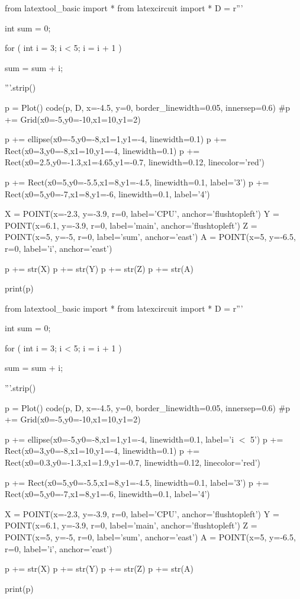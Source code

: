 \begin{python}
from latextool_basic import *
from latexcircuit import *
D = r'''



int sum = 0;

    for ( int i = 3;     i < 5;     i = i + 1 )


        sum = sum + i;



'''.strip()

p = Plot()
code(p, D, x=-4.5, y=0, border_linewidth=0.05, innersep=0.6)
#p += Grid(x0=-5,y0=-10,x1=10,y1=2)

p += ellipse(x0=-5,y0=-8,x1=1,y1=-4, linewidth=0.1)
p += Rect(x0=3,y0=-8,x1=10,y1=-4, linewidth=0.1)
p += Rect(x0=2.5,y0=-1.3,x1=4.65,y1=-0.7, linewidth=0.12, linecolor='red')

p += Rect(x0=5,y0=-5.5,x1=8,y1=-4.5, linewidth=0.1, label='3')
p += Rect(x0=5,y0=-7,x1=8,y1=-6, linewidth=0.1, label='4')

X = POINT(x=-2.3, y=-3.9, r=0, label='CPU', anchor='flushtopleft')
Y = POINT(x=6.1, y=-3.9, r=0, label='main', anchor='flushtopleft')
Z = POINT(x=5, y=-5, r=0, label='sum', anchor='east')
A = POINT(x=5, y=-6.5, r=0, label='i', anchor='east')

p += str(X)
p += str(Y)
p += str(Z)
p += str(A)

print(p)
\end{python}

\begin{python}
from latextool_basic import *
from latexcircuit import *
D = r'''



int sum = 0;

    for ( int i = 3;     i < 5;     i = i + 1 )


        sum = sum + i;



'''.strip()

p = Plot()
code(p, D, x=-4.5, y=0, border_linewidth=0.05, innersep=0.6)
#p += Grid(x0=-5,y0=-10,x1=10,y1=2)

p += ellipse(x0=-5,y0=-8,x1=1,y1=-4, linewidth=0.1, label='i $<$ 5')
p += Rect(x0=3,y0=-8,x1=10,y1=-4, linewidth=0.1)
p += Rect(x0=0.3,y0=-1.3,x1=1.9,y1=-0.7, linewidth=0.12, linecolor='red')

p += Rect(x0=5,y0=-5.5,x1=8,y1=-4.5, linewidth=0.1, label='3')
p += Rect(x0=5,y0=-7,x1=8,y1=-6, linewidth=0.1, label='4')

X = POINT(x=-2.3, y=-3.9, r=0, label='CPU', anchor='flushtopleft')
Y = POINT(x=6.1, y=-3.9, r=0, label='main', anchor='flushtopleft')
Z = POINT(x=5, y=-5, r=0, label='sum', anchor='east')
A = POINT(x=5, y=-6.5, r=0, label='i', anchor='east')

p += str(X)
p += str(Y)
p += str(Z)
p += str(A)

print(p)
\end{python}

